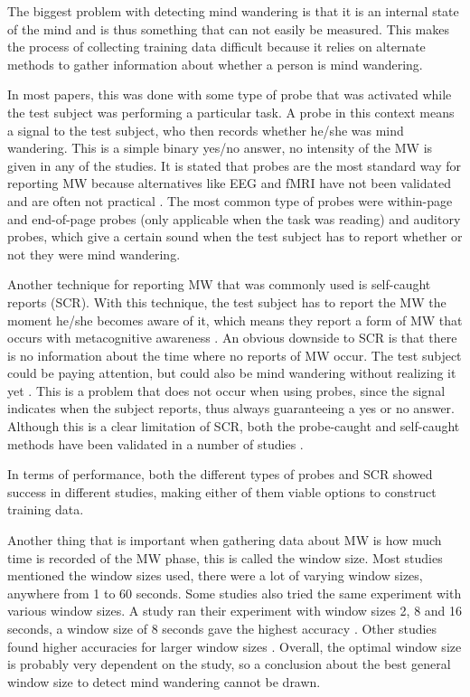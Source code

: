 The biggest problem with detecting mind wandering is that it is an internal state of the mind and is thus something that can not easily be measured. This makes the process of collecting training data difficult because it relies on alternate methods to gather information about whether a person is mind wandering.

In most papers, this was done with some type of probe that was activated while the test subject was performing a particular task. A probe in this context means a signal to the test subject, who then records whether he/she was mind wandering. This is a simple binary yes/no answer, no intensity of the MW is given in any of the studies. It is stated that probes are the most standard way for reporting MW because alternatives like EEG and fMRI have not been validated and are often not practical \cite{Bixler2015AutomaticPhysiology}. The most common type of probes were within-page and end-of-page probes (only applicable when the task was reading) and auditory probes, which give a certain sound when the test subject has to report whether or not they were mind wandering.

Another technique for reporting MW that was commonly used is self-caught reports (SCR). With this technique, the test subject has to report the MW the moment he/she becomes aware of it, which means they report a form of MW that occurs with metacognitive awareness \cite{Bixler2015AutomaticAwareness}. An obvious downside to SCR is that there is no information about the time where no reports of MW occur. The test subject could be paying attention, but could also be mind wandering without realizing it yet \cite{Bixler2015AutomaticAwareness}. This is a problem that does not occur when using probes, since the signal indicates when the subject reports, thus always guaranteeing a yes or no answer. Although this is a clear limitation of SCR, both the probe-caught and self-caught methods have been validated in a number of studies \cite{Bixler2015AutomaticPhysiology}. 

In terms of performance, both the different types of probes and SCR showed success in different studies, making either of them viable options to construct training data. 

Another thing that is important when gathering data about MW is how much time is recorded of the MW phase, this is called the window size. Most studies mentioned the window sizes used, there were a lot of varying window sizes, anywhere from 1 to 60 seconds. Some studies also tried the same experiment with various window sizes. A study ran their experiment with window sizes 2, 8 and 16 seconds, a window size of 8 seconds gave the highest accuracy \cite{ISI:000443429900018}. Other studies found higher accuracies for larger window sizes \cite{Bixler2015AutomaticPhysiology}\cite{Bixler2015AutomaticAwareness}\cite{Stewart2017FaceComprehension}. Overall, the optimal window size is probably very dependent on the study, so a conclusion about the best general window size to detect mind wandering cannot be drawn.
